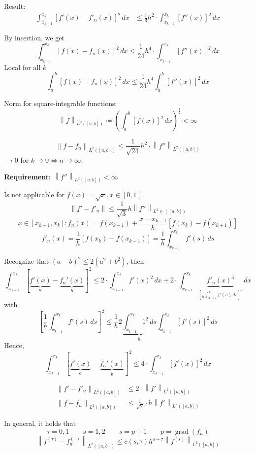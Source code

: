 \documentclass{article}
\newcommand{\norm}[1]{\left\|#1\right\|}
\begin{document}
Result:
\begin{align*}
  \int_{x_{k-1}}^{x_k} \left[f'(x) - f'_n(x)\right]^2 \, dx
    &\leq \frac13 h^2 \cdot \int_{x_{k-1}}^{x_k} \left[f''(x)\right]^2 \, dx
\end{align*}

By insertion, we get
\[
  \int_{x_{k-1}}^{x_k} \left[f(x) - f_n(x)\right]^2 \, dx
  \leq \frac1{24} h^4 \cdot \int_{x_{k-1}}^{x_k} \left[f''(x)\right]^2 \, dx
\]
Local for all $k$
\[
  \int_a^b \left[f(x) - f_n(x)\right]^2 \, dx
  \leq \frac1{24} h^4 \int_a^b \left[f''(x)\right]^2 \, dx
\]

Norm for square-integrable functions:
\[
  \norm{f}_{L^2([a,b])} \coloneqq \left(\int_a^b [f(x)]^2 \, dx\right)^{\frac12} < \infty
\]

\[ \norm{f - f_n}_{L^2([a,b])} \leq \frac{1}{\sqrt{24}} h^2 \cdot \norm{f''}_{L^2([a,b])} \]
$\to 0$ for $k \to 0 \iff n \to \infty$.

\textbf{Requirement:} $\norm{f''}_{L^2([a,b])} < \infty$

Is not applicable for $f(x) = \sqrt{x}, x \in [0,1]$.
\[
  \norm{f' - f'_n}
  \leq \frac{1}{\sqrt{3}} h \norm{f''}_{L^2 \in ([a,b])}
\] \[
  x \in [x_{k-1}, x_k]:
  f_n(x) = f(x_{k-1}) + \frac{x - x_{k-1}}{h} \left[
    f(x_k) - f(x_{k+1})
  \right]
\] \[
  f'_n(x) = \frac1h \left[f(x_k) - f(x_{k-1})\right]
    = \frac1h \int_{x_{k-1}}^{x_k} f'(s) \, ds
\]

Recognize that $(a - b)^2 \leq 2(a^2 + b^2)$, then
\[
  \int_{x_{k-1}}^{x_k} \left[\underbrace{f'(x)}_{a} - \underbrace{f_n'(x)}_{b}\right]^2
    \leq 2 \cdot \int_{x_{k-1}}^{x_k} f'(x)^2 \, dx
      + 2 \cdot \int_{x_{k-1}}^{x_k} \underbrace{f'_n(x)^3}_{\left[\frac1h \int_{x_{k-1}}^{x_k} f'(s) \, ds\right]^2} \, dx
\]
with
\[
  \left[\frac1h \int_{x_{k-1}}^{x_k} f'(s) \, ds\right]^2
  \leq \frac1h 2 \underbrace{\int_{x_{k-1}}^{x_k} 1^2 \, ds}_{h}
  \int_{x_{k-1}}^{x_k} \left[f'(s)\right]^2 \, ds
\]
Hence,
\[
  \int_{x_{k-1}}^{x_k} \left[\underbrace{f'(x)}_{a} - \underbrace{f_n'(x)}_{b}\right]^2
  \leq 4 \cdot \int_{x_{k-1}}^{x_k} \left[f'(x)\right]^2 \, dx
\]

\begin{align*}
  \norm{f' - f'_n}_{L^2([a,b])} &\leq 2 \cdot \norm{f'}_{L^2([a,b])} \\
  \norm{f - f_n}_{L^2([a,b])} &\leq \frac1{\sqrt2} \cdot h \norm{f'}_{L^2([a,b])}
\end{align*}

In general, it holds that
\[ \tau = 0,1 \qquad s = 1,2 \qquad s = p+1 \qquad p = \operatorname{grad}(f_n) \]
\[ \norm{f^{(\tau)} - f_n^{(\tau)}}_{L^2([a,b])} \leq c(s, \tau) h^{s-\tau}\norm{f^{(s)}}_{L^2([a,b])} \]
\end{document}

